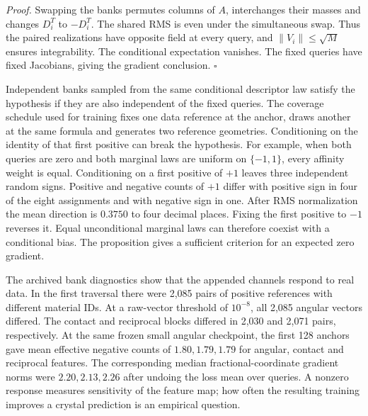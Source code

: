 \emph{Proof.} Swapping the banks permutes columns of \(A\), interchanges their masses and changes \(D_i^T\) to \(-D_i^T\). The shared RMS is even under the simultaneous swap. Thus the paired realizations have opposite field at every query, and \(\|V_i\|\leq\sqrt M\) ensures integrability. The conditional expectation vanishes. The fixed queries have fixed Jacobians, giving the gradient conclusion. \(\square\)

Independent banks sampled from the same conditional descriptor law satisfy the hypothesis if they are also independent of the fixed queries. The coverage schedule used for training fixes one data reference at the anchor, draws another at the same formula and generates two reference geometries. Conditioning on the identity of that first positive can break the hypothesis. For example, when both queries are zero and both marginal laws are uniform on \(\{-1,1\}\), every affinity weight is equal. Conditioning on a first positive of \(+1\) leaves three independent random signs. Positive and negative counts of \(+1\) differ with positive sign in four of the eight assignments and with negative sign in one. After RMS normalization the mean direction is \(0.3750\) to four decimal places. Fixing the first positive to \(-1\) reverses it. Equal unconditional marginal laws can therefore coexist with a conditional bias. The proposition gives a sufficient criterion for an expected zero gradient.

The archived bank diagnostics show that the appended channels respond to real data. In the first traversal there were 2,085 pairs of positive references with different material IDs. At a raw-vector threshold of \(10^{-8}\), all 2,085 angular vectors differed. The contact and reciprocal blocks differed in 2,030 and 2,071 pairs, respectively. At the same frozen small angular checkpoint, the first 128 anchors gave mean effective negative counts of \(1.80,1.79,1.79\) for angular, contact and reciprocal features. The corresponding median fractional-coordinate gradient norms were \(2.20,2.13,2.26\) after undoing the loss mean over queries. A nonzero response measures sensitivity of the feature map; how often the resulting training improves a crystal prediction is an empirical question.

